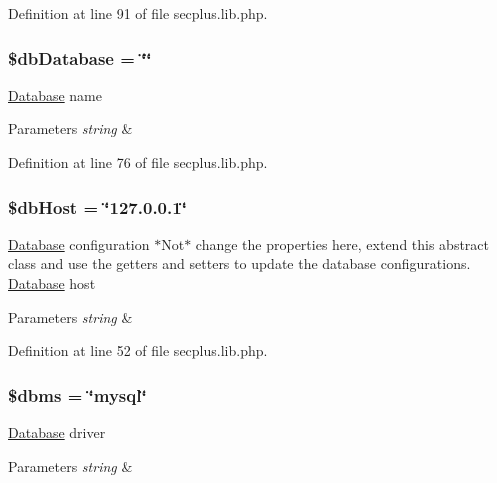 Definition at line 91 of file secplus.lib.php.

\hypertarget{class_sec_plus_1_1_config_a00d9dc02081f2b17c0dae80bf86fea99}{
\subsubsection[{\$dbDatabase}]{\setlength{\rightskip}{0pt plus 5cm}\$dbDatabase = \char`\"{}\char`\"{}}}
\label{class_sec_plus_1_1_config_a00d9dc02081f2b17c0dae80bf86fea99}
\hyperlink{class_sec_plus_1_1_database}{Database} name 
\begin{DoxyParams}{Parameters}
{\em string} & \\
\hline
\end{DoxyParams}


Definition at line 76 of file secplus.lib.php.

\hypertarget{class_sec_plus_1_1_config_ad0ddb2725e69c88a729e0cc242a1b2a6}{
\subsubsection[{\$dbHost}]{\setlength{\rightskip}{0pt plus 5cm}\$dbHost = \char`\"{}127.0.0.1\char`\"{}}}
\label{class_sec_plus_1_1_config_ad0ddb2725e69c88a729e0cc242a1b2a6}
\hyperlink{class_sec_plus_1_1_database}{Database} configuration $\ast$Not$\ast$ change the properties here, extend this abstract class and use the getters and setters to update the database configurations. \hyperlink{class_sec_plus_1_1_database}{Database} host 
\begin{DoxyParams}{Parameters}
{\em string} & \\
\hline
\end{DoxyParams}


Definition at line 52 of file secplus.lib.php.

\hypertarget{class_sec_plus_1_1_config_afab8c86a322f139eb79e33a312ea64b5}{
\subsubsection[{\$dbms}]{\setlength{\rightskip}{0pt plus 5cm}\$dbms = \char`\"{}mysql\char`\"{}}}
\label{class_sec_plus_1_1_config_afab8c86a322f139eb79e33a312ea64b5}
\hyperlink{class_sec_plus_1_1_database}{Database} driver 
\begin{DoxyParams}{Parameters}
{\em string} & \\
\hline
\end{DoxyParams}



